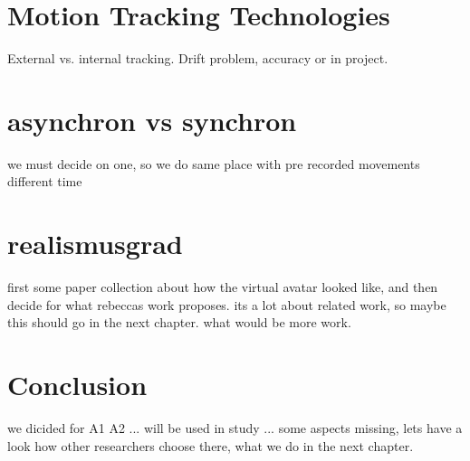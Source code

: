 \section{Motion Tracking Technologies}
External vs. internal tracking. Drift problem, accuracy or in project.

\section{asynchron vs synchron}
we must decide on one, so we do same place with pre recorded movements different time \markAtenSync
\section{realismusgrad}
first some paper collection about how the virtual avatar looked like, and then decide for what rebeccas work proposes. its a lot about related work, so maybe this should go in the next chapter. what would be more work. \markAonefourRealism
\section{Conclusion}
we dicided for A1 A2 ... will be used in study ... some aspects missing, lets have a look how other researchers choose there, what we do in the next chapter.